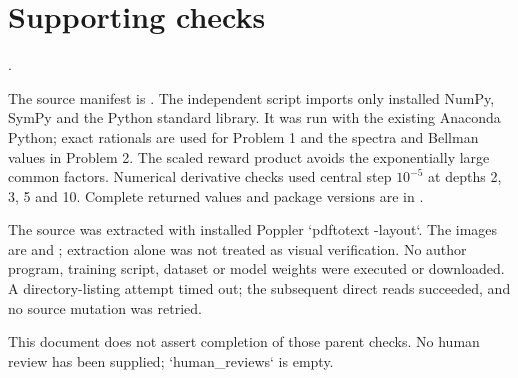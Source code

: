 \documentclass[10pt]{article}
\begin{document}
\section*{Supporting checks}
.\par
The source manifest is . The independent script imports only installed NumPy, SymPy and the Python standard library. It was run with the existing Anaconda Python; exact rationals are used for Problem 1 and the spectra and Bellman values in Problem 2. The scaled reward product avoids the exponentially large common factors. Numerical derivative checks used central step \(10^{-5}\) at depths 2, 3, 5 and 10. Complete returned values and package versions are in .\par
The source was extracted with installed Poppler `pdftotext -layout`. The images are and ; extraction alone was not treated as visual verification. No author program, training script, dataset or model weights were executed or downloaded. A directory-listing attempt timed out; the subsequent direct reads succeeded, and no source mutation was retried.\par
This document does not assert completion of those parent checks. No human review has been supplied; `human\_reviews` is empty.\par
\end{document}
